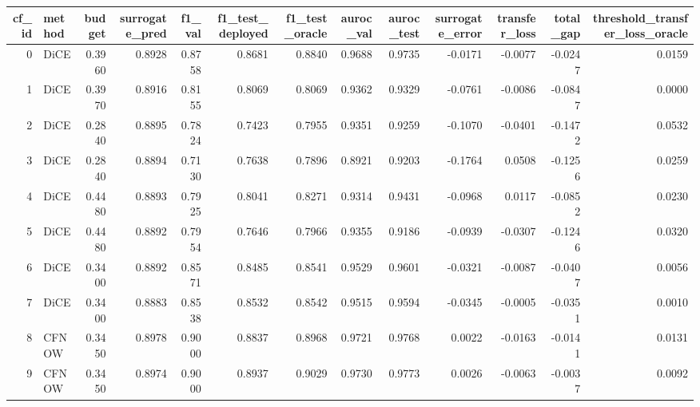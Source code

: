 \begin{tabular}{rlrrrrrrrrrrr}
\toprule
 cf\_id & method &  budget &  surrogate\_pred &  f1\_val &  f1\_test\_deployed &  f1\_test\_oracle &  auroc\_val &  auroc\_test &  surrogate\_error &  transfer\_loss &  total\_gap &  threshold\_transfer\_loss\_oracle \\
\midrule
     0 &   DiCE &  0.3960 &          0.8928 &  0.8758 &            0.8681 &          0.8840 &     0.9688 &      0.9735 &          -0.0171 &        -0.0077 &    -0.0247 &                          0.0159 \\
     1 &   DiCE &  0.3970 &          0.8916 &  0.8155 &            0.8069 &          0.8069 &     0.9362 &      0.9329 &          -0.0761 &        -0.0086 &    -0.0847 &                          0.0000 \\
     2 &   DiCE &  0.2840 &          0.8895 &  0.7824 &            0.7423 &          0.7955 &     0.9351 &      0.9259 &          -0.1070 &        -0.0401 &    -0.1472 &                          0.0532 \\
     3 &   DiCE &  0.2840 &          0.8894 &  0.7130 &            0.7638 &          0.7896 &     0.8921 &      0.9203 &          -0.1764 &         0.0508 &    -0.1256 &                          0.0259 \\
     4 &   DiCE &  0.4480 &          0.8893 &  0.7925 &            0.8041 &          0.8271 &     0.9314 &      0.9431 &          -0.0968 &         0.0117 &    -0.0852 &                          0.0230 \\
     5 &   DiCE &  0.4480 &          0.8892 &  0.7954 &            0.7646 &          0.7966 &     0.9355 &      0.9186 &          -0.0939 &        -0.0307 &    -0.1246 &                          0.0320 \\
     6 &   DiCE &  0.3400 &          0.8892 &  0.8571 &            0.8485 &          0.8541 &     0.9529 &      0.9601 &          -0.0321 &        -0.0087 &    -0.0407 &                          0.0056 \\
     7 &   DiCE &  0.3400 &          0.8883 &  0.8538 &            0.8532 &          0.8542 &     0.9515 &      0.9594 &          -0.0345 &        -0.0005 &    -0.0351 &                          0.0010 \\
     8 &  CFNOW &  0.3450 &          0.8978 &  0.9000 &            0.8837 &          0.8968 &     0.9721 &      0.9768 &           0.0022 &        -0.0163 &    -0.0141 &                          0.0131 \\
     9 &  CFNOW &  0.3450 &          0.8974 &  0.9000 &            0.8937 &          0.9029 &     0.9730 &      0.9773 &           0.0026 &        -0.0063 &    -0.0037 &                          0.0092 \\

\end{tabular}
